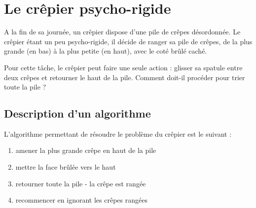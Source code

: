 \chapter*{Le crêpier psycho-rigide}

A la fin de sa journée, un crêpier dispose d'une pile de crêpes désordonnée. Le
crêpier étant un peu psycho-rigide, il décide de ranger sa pile de crêpes, de la
plus grande (en bas) à la plus petite (en haut), avec le coté brûlé caché.

\begin{center}
  
\end{center}

Pour cette tâche, le crêpier peut faire une seule action : glisser sa spatule
entre deux crêpes et retourner le haut de la pile. Comment doit-il procéder pour
trier toute la pile ?

\begin{center}
  
\end{center}



\newpage

\section*{Description d'un algorithme}

L'algorithme permettant de résoudre le problème du crêpier est le suivant :

\begin{enumerate}
\item amener la plus grande crêpe en haut de la pile
\item mettre la face brûlée vers le haut
\item retourner toute la pile - la crêpe est rangée
\item recommencer en ignorant les crêpes rangées
\end{enumerate}

